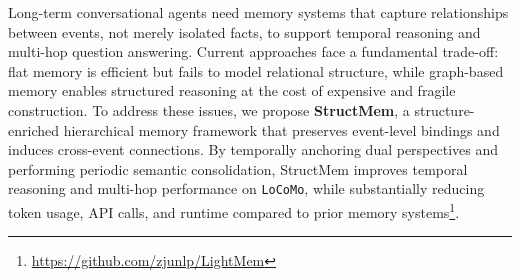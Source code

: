 Long-term conversational agents need memory systems that capture relationships between events, not merely isolated facts, to support temporal reasoning and multi-hop question answering. Current approaches face a fundamental trade-off: flat memory is efficient but fails to model relational structure, while graph-based memory enables structured reasoning at the cost of expensive and fragile construction. To address these issues, we propose \textbf{StructMem}, a structure-enriched hierarchical memory framework that preserves event-level bindings and induces cross-event connections. By temporally anchoring dual perspectives and performing periodic semantic consolidation, StructMem improves temporal reasoning and multi-hop performance on \texttt{LoCoMo}, while substantially reducing token usage, API calls, and runtime compared to prior memory systems\footnote{\url{https://github.com/zjunlp/LightMem}}. 
   


